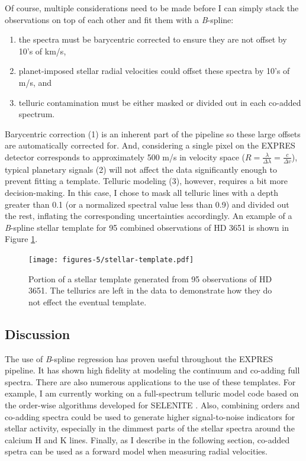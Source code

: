 Of course, multiple considerations need to be made before I can simply stack the observations on top of each other and fit them with a \textit{B}-spline:
\begin{enumerate}
    \item the spectra must be barycentric corrected to ensure they are not offset by 10's of km/s,
    \item planet-imposed stellar radial velocities could offset these spectra by 10's of m/s, and
    \item telluric contamination must be either masked or divided out in each co-added spectrum.
\end{enumerate}
Barycentric correction (1) is an inherent part of the pipeline so these large offsets are automatically corrected for. And, considering a single pixel on the EXPRES detector corresponds to approximately 500 m/s in velocity space ($R = \frac{\lambda}{\Delta\lambda} = \frac{c}{\Delta v}$), typical planetary signals (2) will not affect the data significantly enough to prevent fitting a template. Telluric modeling (3), however, requires a bit more decision-making. In this case, I chose to mask all telluric lines with a depth greater than 0.1 (or a normalized spectral value less than 0.9) and divided out the rest, inflating the corresponding uncertainties accordingly. An example of a \textit{B}-spline stellar template for 95 combined observations of HD 3651 is shown in Figure \ref{fig:stellar-template}. 

\begin{figure}
    \centering
    \texttt{[image: figures-5/stellar-template.pdf]}
    \caption[HD 3651 stellar template]{Portion of a stellar template generated from 95 observations of HD 3651. The tellurics are left in the data to demonstrate how they do not effect the eventual template.}
    \label{fig:stellar-template}
\end{figure}

\subsection{Discussion}

The use of \textit{B}-spline regression has proven useful throughout the EXPRES pipeline. It has shown high fidelity at modeling the continuum and co-adding full spectra. There are also numerous applications to the use of these templates. For example, I am currently working on a full-spectrum telluric model code based on the order-wise algorithms developed for SELENITE \citep{leet_toward_2019}. Also, combining orders and co-adding spectra could be used to generate higher signal-to-noise indicators for stellar activity, especially in the dimmest parts of the stellar spectra around the calcium H and K lines. Finally, as I describe in the following section, co-added spetra can be used as a forward model when measuring radial velocities.

